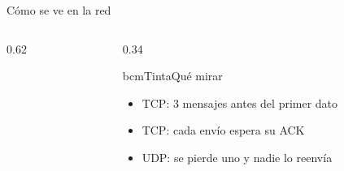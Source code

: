 \begin{frame}{Cómo se ve en la red}
  \begin{columns}[c]
    \begin{column}{0.62\textwidth}
    \end{column}
    \begin{column}{0.34\textwidth}
      \begin{tarjeta}{bcmTinta}{Qué mirar}
        \small
        \begin{itemize}
          \item TCP: 3 mensajes antes del primer dato
          \item TCP: cada envío espera su ACK
          \item UDP: se pierde uno y nadie lo reenvía
        \end{itemize}
      \end{tarjeta}
    \end{column}
  \end{columns}
\end{frame}
